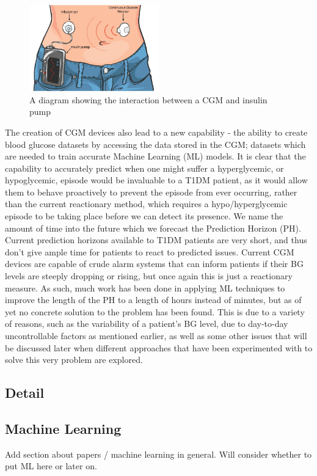     \begin{figure}[H]
      \centering
      \includegraphics[width=0.5\textwidth]{images/CGMPump.png}
      \caption{
       A diagram showing the interaction between a CGM and insulin pump\cite{pumpandmonitor}
      }
    \end{figure}
    
    The creation of CGM devices also lead to a new capability - the ability to create blood glucose datasets by accessing the data stored in the CGM; datasets which are needed to train accurate Machine Learning (ML) models. It is clear that the capability to accurately predict when one might suffer a hyperglycemic, or hypoglycemic, episode would be invaluable to a T1DM patient, as it would allow them to behave proactively to prevent the episode from ever occurring, rather than the current reactionary method, which requires a hypo/hyperglycemic episode to be taking place before we can detect its presence. We name the amount of time into the future which we forecast the Prediction Horizon (PH). Current prediction horizons available to T1DM patients are very short, and thus don't give ample time for patients to react to predicted issues. Current CGM devices are capable of crude alarm systems that can inform patients if their BG levels are steeply dropping or rising, but once again this is just a reactionary measure. As such, much work has been done in applying ML techniques to improve the length of the PH to a length of hours instead of minutes, but as of yet no concrete solution to the problem has been found. This is due to a variety of reasons, such as the variability of a patient's BG level, due to day-to-day uncontrollable factors as mentioned earlier, as well as some other issues that will be discussed later when different approaches that have been experimented with to solve this very problem are explored.

	\subsection{Detail}
    \subsection{Machine Learning}
      Add section about papers / machine learning in general. Will consider whether to put ML here or later on.

